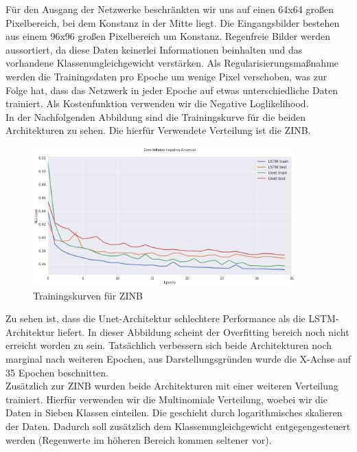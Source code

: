 \noindent Für den Ausgang der Netzwerke beschränkten wir uns auf einen 64x64 großen Pixelbereich, bei dem Konstanz in der Mitte liegt. Die Eingangsbilder bestehen aus einem 96x96 großen Pixelbereich um Konstanz. Regenfreie Bilder werden aussortiert, da diese Daten keinerlei Informationen beinhalten und das vorhandene Klassenungleichgewicht verstärken. Als Regularisierungsmaßnahme werden die Trainingsdaten pro Epoche um wenige Pixel verschoben, was zur Folge hat, dass das Netzwerk in jeder Epoche auf etwas unterschiedliche Daten trainiert. Als Kostenfunktion verwenden wir die Negative Loglikelihood.
\\

\noindent In der Nachfolgenden Abbildung sind die Trainingskurve für die beiden Architekturen zu sehen. Die hierfür Verwendete Verteilung ist die ZINB.

\begin{figure}[htb]
 \centering
 \includegraphics[width=0.9\textwidth,angle=0]{abb/Loss_zinfBinom.png}
 \caption{Trainingskurven für ZINB}
\label{fig:Inception-Conv-LSTM}
\end{figure}

\noindent Zu sehen ist, dass die Unet-Architektur schlechtere Performance als die LSTM-Architektur liefert. In dieser Abbildung scheint der Overfitting bereich noch nicht erreicht worden zu sein.
Tatsächlich verbessern sich beide Architekturen noch marginal nach weiteren Epochen, aus Darstellungsgründen wurde die X-Achse auf 35 Epochen beschnitten.\\

\noindent Zusätzlich zur ZINB wurden beide Architekturen mit einer weiteren Verteilung trainiert. Hierfür verwenden wir die Multinomiale Verteilung, woebei wir die Daten in Sieben Klassen einteilen. Die geschieht durch logarithmisches skalieren der Daten. Dadurch soll zusätzlich dem Klassenungleichgewicht entgegengesteuert werden (Regenwerte im höheren Bereich kommen seltener vor). 

